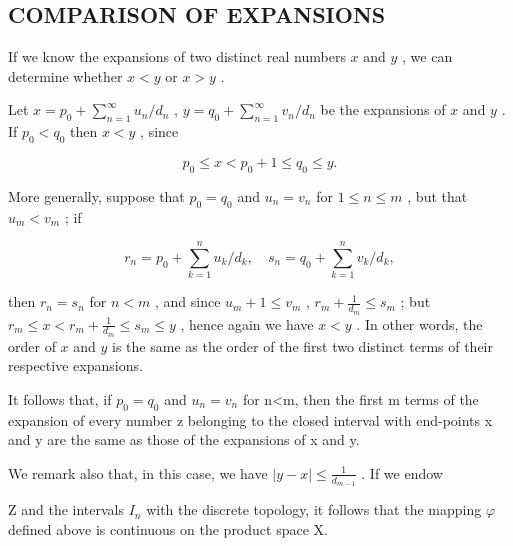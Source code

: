 \subsection{COMPARISON OF EXPANSIONS}

If we know the expansions of two distinct real numbers \(x\) and \(y\) , we can determine whether \(x < y\) or \(x > y\) .

Let \(x = p_0 + \sum_{n=1}^{\infty} u_n / d_n\) , \(y = q_0 + \sum_{n=1}^{\infty} v_n / d_n\) be the expansions of \(x\) and \(y\) . If \(p_0 < q_0\) then \(x < y\) , since

\[
p _ {0} \leqslant x <   p _ {0} + 1 \leqslant q _ {0} \leqslant y.
\]

More generally, suppose that \(p_0 = q_0\) and \(u_n = v_n\) for \(1 \leqslant n \leqslant m\) , but that \(u_m < v_m\) ; if

\[
r _ {n} = p _ {0} + \sum_ {k = 1} ^ {n} u _ {k} / d _ {k}, \quad s _ {n} = q _ {0} + \sum_ {k = 1} ^ {n} v _ {k} / d _ {k},
\]

then \(r_n = s_n\) for \(n < m\) , and since \(u_m + 1 \leqslant v_m\) , \(r_m + \frac{1}{d_m} \leqslant s_m\) ; but \(r_m \leqslant x < r_m + \frac{1}{d_m} \leqslant s_m \leqslant y\) , hence again we have \(x < y\) . In other words, the order of \(x\) and \(y\) is the same as the order of the first two distinct terms of their respective expansions.

It follows that, if \(p_{0}=q_{0}\) and \(u_{n}=v_{n}\) for n\textless m, then the first m terms of the expansion of every number z belonging to the closed interval with end-points x and y are the same as those of the expansions of x and y.

We remark also that, in this case, we have \(|y - x| \leqslant \frac{1}{d_{m-1}}\) . If we endow

Z and the intervals \(I_{n}\) with the discrete topology, it follows that the mapping \(\varphi\) defined above is continuous on the product space X.

